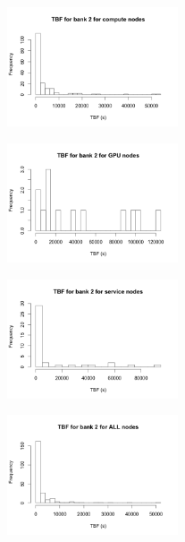 \begin{figure}
\centering
\includegraphics[width=0.45\textwidth]{images/tbf_2_c.png}
\end{figure}

\begin{figure}
\centering
\includegraphics[width=0.45\textwidth]{images/tbf_2_g.png}
\end{figure}

\begin{figure}
\centering
\includegraphics[width=0.45\textwidth]{images/tbf_2_s.png}
\end{figure}

\begin{figure}
\centering
\includegraphics[width=0.45\textwidth]{images/tbf_2_a.png}
\end{figure}


